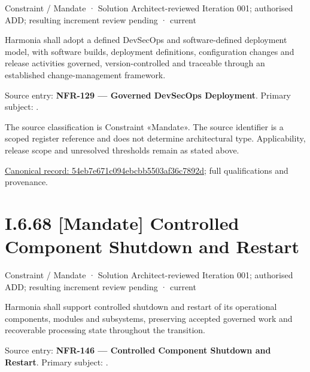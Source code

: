 \label{element:54eb7e671c094ebcbb5503af36c7892d}
{\small Constraint / Mandate · Solution Architect-reviewed Iteration 001; authorised ADD; resulting increment review pending · current}\par

Harmonia shall adopt a defined DevSecOps and software-defined deployment model, with software builds, deployment definitions, configuration changes and release activities governed, version-controlled and traceable through an established change-management framework.



Source entry: \textbf{NFR-129 — Governed DevSecOps Deployment}. Primary subject: \texttt{}.



The source classification is Constraint «Mandate». The source identifier is a scoped register reference and does not determine architectural type. Applicability, release scope and unresolved thresholds remain as stated above.


{\footnotesize \href{../../../../continuum/motivation/constraint/mandate/54eb7e671c094ebcbb5503af36c7892d.md}{Canonical record: 54eb7e671c094ebcbb5503af36c7892d}; full qualifications and provenance.}\par
\section*{I.6.68 [Mandate] Controlled Component Shutdown and Restart}
\label{navigation:I.6.68}

\label{element:96f7bfa320b049d2b76fcc35a1926883}
{\small Constraint / Mandate · Solution Architect-reviewed Iteration 001; authorised ADD; resulting increment review pending · current}\par

Harmonia shall support controlled shutdown and restart of its operational components, modules and subsystems, preserving accepted governed work and recoverable processing state throughout the transition.



Source entry: \textbf{NFR-146 — Controlled Component Shutdown and Restart}. Primary subject: \texttt{}.



